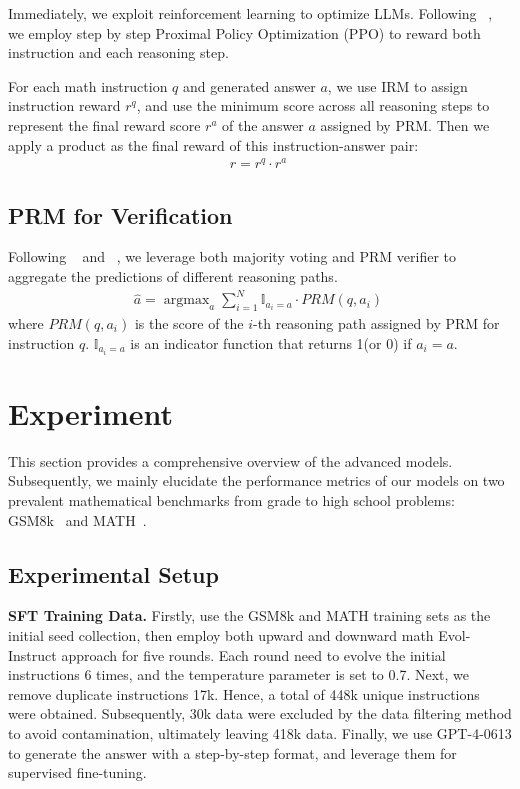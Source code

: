 Immediately, we exploit reinforcement learning to optimize LLMs. Following ~\citep{lightman2023openai-verify-step-by-step}, we employ step by step Proximal Policy Optimization (PPO) to reward both instruction and each reasoning step.

For each math instruction $q$ and generated answer $a$, we use IRM to assign instruction reward $r^q$, and use the minimum score across all reasoning steps to represent the final reward score $r^a$ of the answer $a$ assigned by PRM. Then we apply a product as the final reward of this instruction-answer pair:
\begin{align}
r = r^q \cdot r^a \
\label{eq:final-loss}
\end{align}

\subsection{PRM for Verification}
Following ~\citep{lightman2023openai-verify-step-by-step} and ~\citep{li-etal-2023-making}, we leverage both majority voting and PRM verifier to  aggregate the predictions of different reasoning paths.
\begin{align}
\hat{a} = \mathop{\arg\max}_{a} \sum_{i=1}^{N} \mathbb{I}_{a_i = a} \cdot PRM(q, a_i)\
\label{eq:loss}
\end{align}
where $PRM(q, a_i)$ is the score of the $i$-th reasoning path assigned by PRM for instruction $q$.  $\mathbb{I}_{a_i = a}$ is an indicator function that returns 1(or 0) if $a_i = a$. 

\section{Experiment}

This section provides a comprehensive overview of the advanced models. Subsequently, we mainly elucidate the performance metrics of our models on two prevalent mathematical benchmarks from grade to high school problems: GSM8k~\citep{cobbe2021training_gsm8k_2} and MATH~\citep{hendrycks2021measuring}.

\subsection{Experimental Setup} \label{sections: exper-setup}

\textbf{SFT Training Data.} Firstly, use the GSM8k and MATH training sets as the initial seed collection, then employ both upward and downward math Evol-Instruct approach for five rounds. Each round need to evolve the initial instructions 6 times, and the temperature parameter is set to 0.7. Next, we remove duplicate instructions 17k. Hence, a total of 448k unique instructions were obtained. Subsequently, 30k data were excluded by the data filtering method to avoid contamination, ultimately leaving 418k data. Finally, we use GPT-4-0613 to generate the answer with a step-by-step format, and leverage them for supervised fine-tuning.

